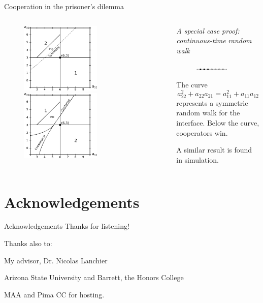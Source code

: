 \documentclass{beamer}
\begin{document}
\begin{frame}{Cooperation in the prisoner's dilemma}
\begin{columns}[c]
  \begin{column}{0.5\textwidth}
    \begin{figure}
\includegraphics[width=0.6\textwidth]{./images/1d_pd_plot.eps}
\vspace{0.05\textheight}
\includegraphics[width=0.6\textwidth]{./images/group_2_bifurcation_diagram_w_PD_line.eps}
    \end{figure}
  \end{column}
  \begin{column}{0.5\textwidth}
    \emph{A special case proof: continuous-time random walk}
    \begin{figure}
      \includegraphics[width=0.7\textwidth]{./images/1dInitialConfig.eps}
    \end{figure}
The curve
\[
    a_{22}^2 + a_{22}a_{21} = a_{11}^2+a_{11}a_{12}
\]
represents a symmetric random walk for the interface. Below the curve, cooperators win.

A similar result is found in simulation.
    \begin{figure}
    \end{figure}
  \end{column}
\end{columns}
\end{frame}

\section{Acknowledgements}
\begin{frame}[c]{Acknowledgements}
Thanks for listening!

\small{Thanks also to:

My advisor, Dr. Nicolas Lanchier

Arizona State University and Barrett, the Honors College}

MAA and Pima CC for hosting.

\end{frame}
\end{document}
